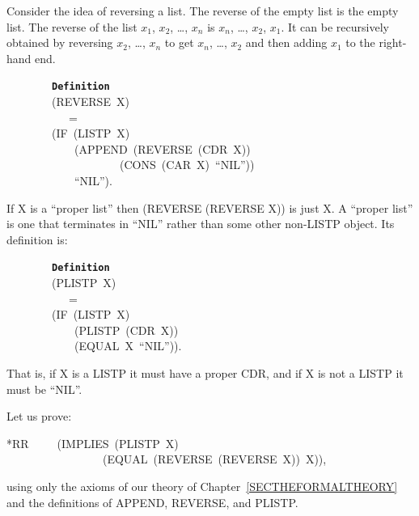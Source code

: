 \documentclass[11pt]{book}
\newenvironment{pubasis}{\begin{flushleft}\ttfamily\small}{\normalsize\rmfamily\end{flushleft}}
\newcommand{\axiomordefinition}[1]{\vspace{6pt}\texttt{\textbf{#1}}}
\begin{document}
Consider the idea of reversing a list.  The reverse of the empty list
is the empty list.  The reverse of the list $x_{1}$, $x_{2}$, \ldots{}, $x_{n}$ is 
$x_{n}$, \ldots{}, $x_{2}$, $x_{1}$.  It can be recursively obtained
by reversing $x_{2}$, \ldots{}, $x_{n}$ to get $x_{n}$, \ldots{}, $x_{2}$ and then
adding $x_{1}$ to the right-hand end.
\begin{pubasis}
~~~~~~~~\axiomordefinition{Definition}\\
~~~~~~~~(REVERSE~X)\\
~~~~~~~~~~~=\\
~~~~~~~~(IF~(LISTP~X)\\
~~~~~~~~~~~~(APPEND~(REVERSE~(CDR~X))\\
~~~~~~~~~~~~~~~~~~~~(CONS~(CAR~X)~``NIL''))\\
~~~~~~~~~~~~``NIL'').\\
\end{pubasis}
If X is a ``proper list'' then (REVERSE (REVERSE X))
is just X.  A ``proper list'' is one that terminates in ``NIL'' rather
than some other non-LISTP object.  Its definition is:
\begin{pubasis}
~~~~~~~~\axiomordefinition{Definition}\\
~~~~~~~~(PLISTP~X)\\
~~~~~~~~~~~=\\
~~~~~~~~(IF~(LISTP~X)\\
~~~~~~~~~~~~(PLISTP~(CDR~X))\\
~~~~~~~~~~~~(EQUAL~X~``NIL'')).\\
\end{pubasis}
That is, if X is a LISTP it must have a proper CDR, and if X is not a LISTP
it must be ``NIL''.

Let us prove:
\begin{pubasis}
*RR~~~~~(IMPLIES~(PLISTP~X)\\
~~~~~~~~~~~~~~~~~(EQUAL~(REVERSE~(REVERSE~X))~X)),\\
\end{pubasis}
using only the axioms of our theory of Chapter~\ref{SECTHEFORMALTHEORY}
and the definitions of APPEND, REVERSE, and PLISTP.
\end{document}
